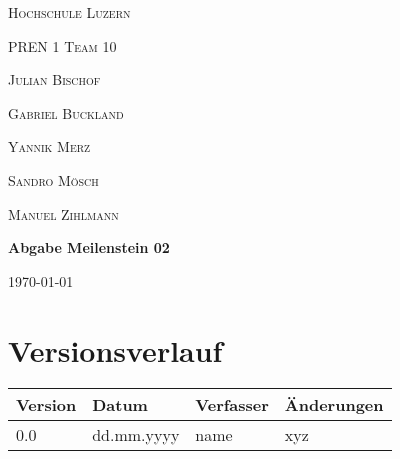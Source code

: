 \documentclass{scrarticle}                %
\newcommand{\Abgabenummer}{02}
\begin{document}

\begin{titlepage}
    \centering
    {\scshape\LARGE Hochschule Luzern \par}
    \vspace{1cm}
    {\scshape\Large PREN 1 Team 10\par}
    \vspace{1cm}

    {\scshape\large Julian Bischof\par}
    {\scshape\large Gabriel Buckland\par}
    {\scshape\large Yannik Merz\par}
    {\scshape\large Sandro Mösch\par}
    {\scshape\large Manuel Zihlmann\par}

    \vspace{1.5cm}
    {\huge\bfseries Abgabe Meilenstein \Abgabenummer \par}

    \vfill
    {\large \today\par}
\end{titlepage}

\newpage


\section*{Versionsverlauf}

\thispagestyle{nofooter}

\begin{longtable}{|p{2cm}|p{3cm}|p{3cm}|p{5cm}|}
    \hline
    \textbf{Version} & \textbf{Datum} & \textbf{Verfasser} & \textbf{Änderungen} \\
    \hline
    0.0              & dd.mm.yyyy     & name               & xyz                 \\
    \hline
\end{longtable}
\end{document}
